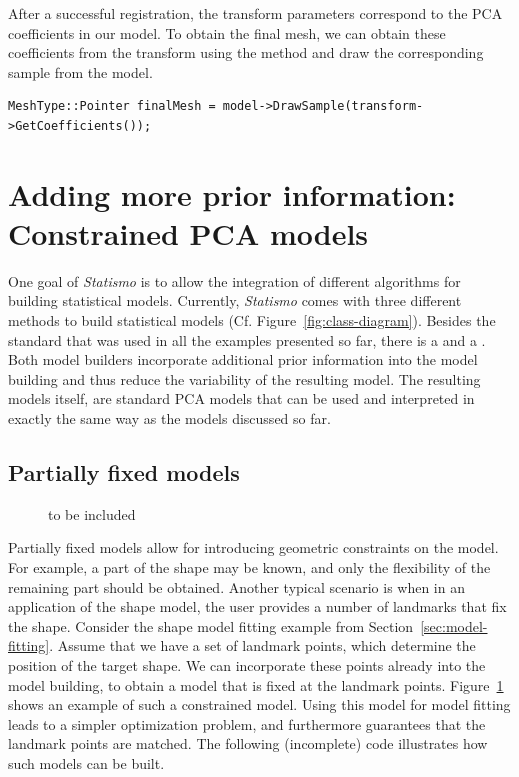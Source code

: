 \documentclass{InsightArticle}
\newcommand{\Statismo}{\emph{Statismo}\xspace}
\begin{document}
After a successful registration, the transform parameters correspond to the PCA coefficients in our model. 
To obtain the final mesh, we can obtain these coefficients from the transform using the method  
and draw the corresponding sample from the model. 
\begin{verbatim}
MeshType::Pointer finalMesh = model->DrawSample(transform->GetCoefficients());
\end{verbatim}


\section{Adding more prior information: Constrained PCA models }
One goal of \Statismo is to allow the integration of  different algorithms for building statistical models.
Currently, \Statismo comes with three different methods to build statistical models (Cf. Figure~\ref{fig:class-diagram}). Besides the standard  that was used in all the examples presented so far, there is a  \cite{luthi_probabilistic_2009} and a  \cite{blanc_conditional_2009}. Both model builders incorporate additional prior information into the model building and thus reduce the variability of the resulting model. The resulting models itself, are standard PCA models that can be used and interpreted in exactly the same way as the models discussed so far. 

\subsection{Partially fixed models}
\begin{figure}
  to be included
    \label{fig:constrained-model}
\end{figure}
Partially fixed models allow for introducing geometric constraints on the model. For example, a part of the shape may be known, and only the flexibility of the remaining part should be obtained. Another typical scenario is when in an application of the shape model, the user provides a number of landmarks that fix the shape. 
Consider the shape model fitting example from Section~\ref{sec:model-fitting}. Assume that we have a set of landmark points, which determine the position of the target shape. We can incorporate these points already into the model building, to obtain a model that is fixed at the landmark points. Figure~\ref{fig:constrained-model} shows an example of such a  constrained model.  Using this model for model fitting leads to a simpler optimization problem, and furthermore guarantees that the landmark points are matched. 
The following (incomplete) code illustrates how such models can be built. 
\end{document}
